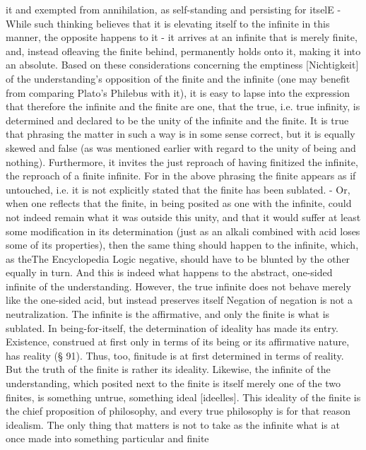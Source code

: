 it and exempted from annihilation, as self-standing and persisting
for itselE - While such thinking believes that it is elevating itself to
the infinite in this manner, the opposite happens to it - it arrives
at an infinite that is merely finite, and, instead ofleaving the
finite behind, permanently holds onto it, making it into an
absolute.
Based on these considerations concerning the emptiness
[Nichtigkeit] of the understanding's opposition of the finite and the
infinite (one may benefit from comparing Plato's Philebus with it),
it is easy to lapse into the expression that therefore the infinite and
the finite are one, that the true, i.e. true infinity, is determined and
declared to be the unity of the infinite and the finite. It is true that
phrasing the matter in such a way is in some sense correct, but it is
equally skewed and false (as was mentioned earlier with regard to
the unity of being and nothing). Furthermore, it invites the just
reproach of having finitized the infinite, the reproach of a finite
infinite. For in the above phrasing the finite appears as if untouched,
i.e. it is not explicitly stated that the finite has been sublated. - Or,
when one reflects that the finite, in being posited as one with the
infinite, could not indeed remain what it was outside this unity, and
that it would suffer at least some modification in its determination
(just as an alkali combined with acid loses some of its properties),
then the same thing should happen to the infinite, which, as theThe Encyclopedia Logic
negative, should have to be blunted by the other equally in turn.
And this is indeed what happens to the abstract, one-sided infinite
of the understanding. However, the true infinite does not behave
merely like the one-sided acid, but instead preserves itself Negation
of negation is not a neutralization. The infinite is the affirmative,
and only the finite is what is sublated.
In being-for-itself, the determination of ideality has made its
entry. Existence, construed at first only in terms of its being or its
affirmative nature, has reality (§ 91). Thus, too, finitude is at first
determined in terms of reality. But the truth of the finite is rather its
ideality. Likewise, the infinite of the understanding, which posited
next to the finite is itself merely one of the two finites, is something
untrue, something ideal [ideelles]. This ideality of the finite is the
chief proposition of philosophy, and every true philosophy is for
that reason idealism. The only thing that matters is not to take as the
infinite what is at once made into something particular and finite
